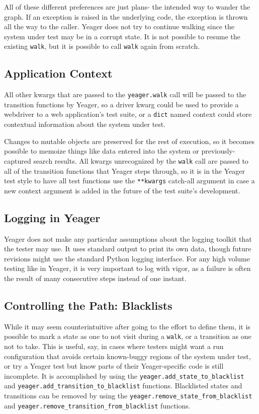 All of these different preferences are just plans- the intended way to wander the graph. If an exception is raised in the underlying code, the exception is thrown all the way to the caller. Yeager does not try to continue walking since the system under test may be in a corrupt state. It is not possible to resume the existing \texttt{walk}, but it is possible to call \texttt{walk} again from scratch.

\subsection{Application Context}
All other kwargs that are passed to the \texttt{yeager.walk} call will be passed to the transition functions by Yeager, so a driver kwarg could be used to provide a webdriver to a web application's test suite, or a \texttt{dict} named context could store contextual information about the system under test.

Changes to mutable objects are preserved for the rest of execution, so it becomes possible to memoize things like data entered into the system or previously-captured search results. All kwargs unrecognized by the \texttt{walk} call are passed to all of the transition functions that Yeager steps through, so it is in the Yeager test style to have all test functions use the \texttt{**kwargs} catch-all argument in case a new context argument is added in the future of the test suite's development.

\subsection{Logging in Yeager}
Yeager does not make any particular assumptions about the logging toolkit that the tester may use. It uses standard output to print its own data, though future revisions might use the standard Python logging interface. For any high volume testing like in Yeager, it is very important to log with vigor, as a failure is often the result of many consecutive steps instead of one instant.

\subsection{Controlling the Path: Blacklists}
While it may seem counterintuitive after going to the effort to define them, it is possible to mark a state as one to not visit during a \texttt{walk}, or a transition as one not to take. This is useful, say, in cases where testers might want a run configuration that avoids certain known-buggy regions of the system under test, or try a Yeager test but know parts of their Yeager-specific code is still incomplete. It is accomplished by using the \texttt{yeager.add\_state\_to\_blacklist} and \texttt{yeager.add\_transition\_to\_blacklist} functions. Blacklisted states and transitions can be removed by using the \texttt{yeager.remove\_state\_from\_blacklist} and \texttt{yeager.remove\_transition\_from\_blacklist} functions.

